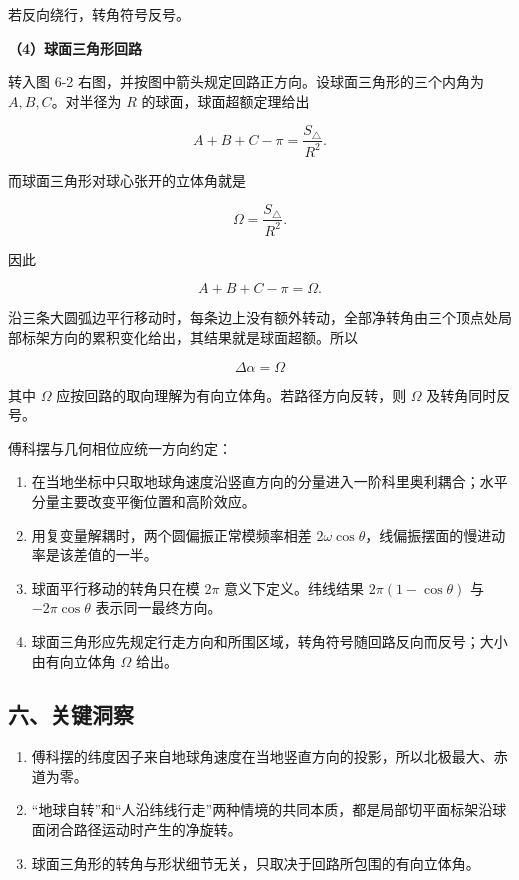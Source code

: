 \documentclass[12pt,a4paper,UTF8]{ctexart}
\newcommand{\tightlist}{\setlength{\itemsep}{0pt}\setlength{\parskip}{0pt}}
\begin{document}
若反向绕行，转角符号反号。

\textbf{（4）球面三角形回路}

转入图 6-2 右图，并按图中箭头规定回路正方向。设球面三角形的三个内角为
\(A,B,C\)。对半径为 \(R\) 的球面，球面超额定理给出

\[
A+B+C-\pi=\frac{S_\triangle}{R^2}.
\]

而球面三角形对球心张开的立体角就是

\[
\Omega=\frac{S_\triangle}{R^2}.
\]

因此

\[
A+B+C-\pi=\Omega.
\]

沿三条大圆弧边平行移动时，每条边上没有额外转动，全部净转角由三个顶点处局部标架方向的累积变化给出，其结果就是球面超额。所以

\[
\boxed{\Delta\alpha=\Omega}
\]

其中 \(\Omega\) 应按回路的取向理解为有向立体角。若路径方向反转，则
\(\Omega\) 及转角同时反号。

傅科摆与几何相位应统一方向约定：

\begin{enumerate}
\def\labelenumi{\arabic{enumi}.}
\tightlist
\item
  在当地坐标中只取地球角速度沿竖直方向的分量进入一阶科里奥利耦合；水平分量主要改变平衡位置和高阶效应。
\item
  用复变量解耦时，两个圆偏振正常模频率相差
  \(2\omega\cos\theta\)，线偏振摆面的慢进动率是该差值的一半。
\item
  球面平行移动的转角只在模 \(2\pi\) 意义下定义。纬线结果
  \(2\pi(1-\cos\theta)\) 与 \(-2\pi\cos\theta\) 表示同一最终方向。
\item
  球面三角形应先规定行走方向和所围区域，转角符号随回路反向而反号；大小由有向立体角
  \(\Omega\) 给出。
\end{enumerate}

\subsection{六、关键洞察}\label{ux516dux5173ux952eux6d1eux5bdf-5}

\begin{enumerate}
\def\labelenumi{\arabic{enumi}.}
\tightlist
\item
  傅科摆的纬度因子来自地球角速度在当地竖直方向的投影，所以北极最大、赤道为零。
\item
  ``地球自转''和``人沿纬线行走''两种情境的共同本质，都是局部切平面标架沿球面闭合路径运动时产生的净旋转。
\item
  球面三角形的转角与形状细节无关，只取决于回路所包围的有向立体角。
\end{enumerate}
\end{document}
